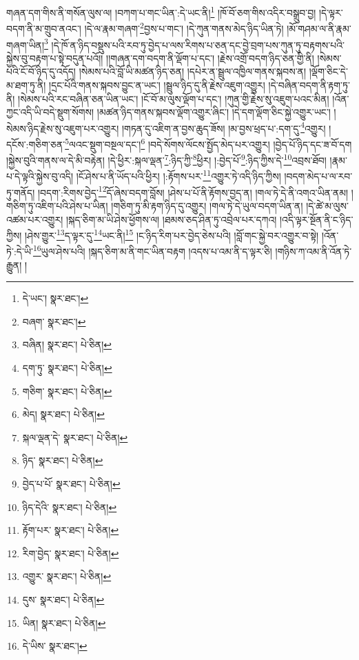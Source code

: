 གཞན་དག་གིས་ནི་གསོན་ལུས་ལ། །བཀག་པ་གང་ཡིན་:དེ་ཡང་ནི།\footnote{དེ་ཡང་།  སྣར་ཐང་། } །ཁོ་བོ་ཅག་གིས་འདིར་བསྒྲུབ་བྱ། །དེ་ལྟར་བདག་ནི་མ་གྲུབ་ནའང་། །དེ་ལ་རྣམ་གཞག་\footnote{བཞག་  སྣར་ཐང་། }བྱས་པ་གང་། །དེ་ཀུན་གནས་མེད་ཉིད་ཡིན་ཏེ། །མོ་གཤམ་ལ་ནི་རྣམ་གཞག་ཡིན།\footnote{བཞིན།  སྣར་ཐང་།  པེ་ཅིན། } །དེ་ཁོ་ན་ཉིད་བསྡུས་པའི་རབ་ཏུ་བྱེད་པ་ལས་རིགས་པ་ཅན་དང་བྱེ་བྲག་པས་ཀུན་ཏུ་བརྟགས་པའི་སྐྱེས་བུ་བརྟག་པ་སྟེ་བདུན་པའོ།། །།གཞན་དག་བདག་ནི་ལྡོག་པ་དང་། །རྗེས་འགྲོ་བདག་ཉིད་ཅན་གྱི་ནི། །སེམས་པའི་ངོ་བོ་ཉིད་དུ་འདོད། །སེམས་པའི་བློ་ཡི་མཚན་ཉིད་ཅན། །དཔེར་ན་སྦྲུལ་འཁྱིལ་གནས་སྐབས་ན། །ལྡོག་ཅིང་དེ་མ་ཐག་ཏུ་ནི། །དྲང་པོའི་གནས་སྐབས་བྱུང་ན་ཡང་། །སྦྲུལ་ཉིད་དུ་ནི་རྗེས་འཇུག་འགྱུར། །དེ་བཞིན་བདག་ནི་རྟག་ཏུ་ནི། །སེམས་པའི་རང་བཞིན་ཅན་ཡིན་ཡང་། །ངོ་བོ་མ་ལུས་ལྡོག་པ་དང་། །ཀུན་གྱི་རྗེས་སུ་འཇུག་པའང་མིན། །འོན་ཀྱང་འདི་ཡི་བདེ་སྡུག་སོགས། །མཚན་ཉིད་གནས་སྐབས་ལྡོག་འགྱུར་ཞིང་། །དེ་དག་ལྡོག་ཅིང་སྐྱེ་འགྱུར་ཡང་། །སེམས་ཉིད་རྗེས་སུ་འཇུག་པར་འགྱུར། །གཏན་དུ་འཇིག་ན་བྱས་ཆུད་ཟོས། །མ་བྱས་ཕྲད་པ་:དག་དུ་\footnote{དག་ཏུ་  སྣར་ཐང་།  པེ་ཅིན། }འགྱུར། །དངོས་:གཅིག་ཅན་\footnote{གཅིག་  སྣར་ཐང་།  པེ་ཅིན། }ལའང་སྡུག་བསྔལ་དང་།\footnote{མེད།  སྣར་ཐང་།  པེ་ཅིན། } །བདེ་སོགས་ལོངས་སྤྱོད་མེད་པར་འགྱུར། །བྱེད་པོ་ཉིད་དང་ཟ་བོ་དག །སྐྱེས་བུའི་གནས་ལ་དེ་མི་བརྟེན། །དེ་ཕྱིར་:སྐལ་ལྡན་\footnote{སྐལ་ལྡན་དེ་  སྣར་ཐང་།  པེ་ཅིན། }:ཉིད་ཀྱི་\footnote{ཉིད་  སྣར་ཐང་།  པེ་ཅིན། }ཕྱིར། །:བྱེད་པོ་\footnote{བྱེད་པ་པོ་  སྣར་ཐང་།  པེ་ཅིན། }:ཉིད་ཀྱིས་དེ་\footnote{ཉིད་དེའི་  སྣར་ཐང་།  པེ་ཅིན། }འབྲས་ཐོབ། །རྣམ་པ་དེ་ལྟའི་སྐྱེས་བུ་འདི། །ངོ་ཤེས་པ་ནི་ཡོད་པའི་ཕྱིར། །:རྟོགས་པར་\footnote{རྟོག་པར་  སྣར་ཐང་།  པེ་ཅིན། }འགྱུར་ཏེ་འདི་ཉིད་ཀྱིས། །བདག་མེད་པ་ལ་རབ་ཏུ་གནོད། །བདག་:རིགས་བྱེད་\footnote{རིག་བྱེད་  སྣར་ཐང་།  པེ་ཅིན། }དོ་ཞེས་བདག་བློས། །ཤེས་པ་པོ་ནི་རྟོགས་བྱད་ན། །གལ་ཏེ་དེ་ནི་འགའ་ཡིན་ནམ། །གཅིག་ཏུ་འཇིག་པའི་ཤེས་པ་ཡིན། །གཅིག་ཏུ་མི་རྟག་ཉིད་དུ་འགྱུར། །གལ་ཏེ་དེ་ཡུལ་བདག་ཡིན་ན། །དེ་ཚེ་མ་ལུས་འཚམ་པར་འགྱུར། །སྐད་ཅིག་མ་ཡི་ཤེས་ཕྱོགས་ལ། །ཐམས་ཅད་ཤིན་ཏུ་འབྲེལ་པར་དཀའ། །འདི་ལྟར་སྔོན་ནི་ང་ཉིད་ཀྱིས། །ཤེས་གྱུར་\footnote{འགྱུར་  སྣར་ཐང་།  པེ་ཅིན། }ད་ལྟར་དུ་\footnote{དུས་  སྣར་ཐང་།  པེ་ཅིན། }ཡང་ནི།\footnote{ཡིན།  སྣར་ཐང་།  པེ་ཅིན། } །ང་ཉིད་རིག་པར་བྱེད་ཅེས་པའི། །བློ་གང་སྐྱེ་བར་འགྱུར་བ་སྟེ། །འོན་ཏེ་:དེ་ཡི་\footnote{དེ་ཡིས་  སྣར་ཐང་། }ཡུལ་ཤེས་པའི། །སྐད་ཅིག་མ་ནི་གང་ཡིན་བརྟག །འདས་པ་འམ་ནི་ད་ལྟར་ཅི། །གཉིས་ཀ་འམ་ནི་འོན་ཏེ་རྒྱུན། །
